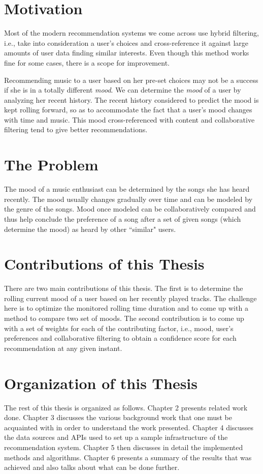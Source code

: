 	\section{Motivation}
		Most of the modern recommendation systems we come across use hybrid filtering, i.e., take into consideration a user's choices and cross-reference it against large amounts of user data finding similar interests. Even though this method works fine for some cases, there is a scope for improvement.

		Recommending music to a user based on her pre-set choices may not be a success if she is in a totally different \emph{mood}. We can determine the \emph{mood} of a user by analyzing her recent history. The recent history considered to predict the mood is kept rolling forward, so as to accommodate the fact that a user's mood changes with time and music. This mood cross-referenced with content and collaborative filtering tend to give better recommendations.

	\section{The Problem}
		The mood of a music enthusiast can be determined by the songs she has heard recently. The mood usually changes gradually over time and can be modeled by the genre of the songs. Mood once modeled can be collaboratively compared and thus help conclude the preference of a song after a set of given songs (which determine the mood) as heard by other ``similar" users.

	\section{Contributions of this Thesis}
		There are two main contributions of this thesis. The first is to determine the rolling current mood of a user based on her recently played tracks. The challenge here is to optimize the monitored rolling time duration and to come up with a method to compare two set of moods. The second contribution is to come up with a set of weights for each of the contributing factor, i.e., mood, user's preferences and collaborative filtering to obtain a confidence score for each recommendation at any given instant.

	\section{Organization of this Thesis}
		The rest of this thesis is organized as follows. Chapter 2 presents related work done. Chapter 3 discusses the various background work that one must be acquainted with in order to understand the work presented. Chapter 4 discusses the data sources and APIs used to set up a sample infrastructure of the recommendation system. Chapter 5 then discusses in detail the implemented methods and algorithms. Chapter 6 presents a summary of the results that was achieved and also talks about what can be done further.
